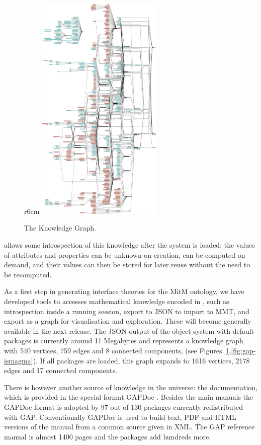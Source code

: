 \begin{figure}r{6cm}\vspace*{-2em}
  \includegraphics[width=6cm]{gap-graph}\vspace*{-.5em}
  \caption{The \GAP Knowledge Graph.\label{fig:gap-graph}}\vspace*{-2em}
\end{figure}
\GAP allows some introspection of this knowledge after the system is loaded: the values of
attributes and properties can be unknown on creation, can be computed on demand, and their
values can then be stored for later reuse without the need to be recomputed.

As a first step in generating interface theories for the MitM ontology, we have developed
tools to accesses mathematical knowledge encoded in \GAP, such as introspection inside a
running \GAP session, export to JSON to import to MMT, and export as a graph for
visualisation and exploration. These will become generally available in the next \GAP
release. The JSON output of the \GAP object system with default packages is currently
around 11 Megabytes and represents a knowledge graph with 540 vertices, 759 edges and 8 connected
components, (see Figures~\ref{fig:gap-graph},\ref{fig:gap-ismagma}). If all
packages are loaded, this graph expands to 1616 vertices, 2178 edges and 17 connected
components.

There is however another source of knowledge in the \GAP universe: the documentation, which is
provided in the special format GAPDoc \cite{gapdoc}. Besides the main manuals the GAPDoc
format is adopted by 97 out of 130 packages currently redistributed with
GAP. Conventionally GAPDoc is used to build text, PDF and HTML versions of the manual
from a common source given in XML. The GAP reference manual is almost 1400 pages and the
packages add hundreds more.

